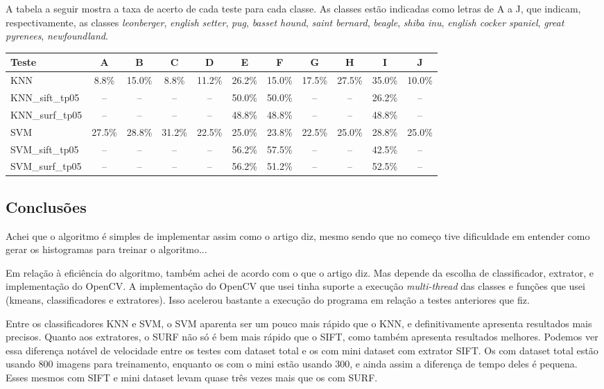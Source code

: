 \vspace{10pt}
A tabela a seguir mostra a taxa de acerto de cada teste para cada classe. As classes
estão indicadas como letras de A a J, que indicam, respectivamente, as classes 
\textit{leonberger}, \textit{english setter}, \textit{pug}, \textit{basset hound}, \textit{saint bernard},
\textit{beagle}, \textit{shiba inu}, \textit{english cocker spaniel}, \textit{great pyrenees}, \textit{newfoundland}.\\
\begin{tabular}{ | l | c | c | c | c | c | c | c | c | c | c | }
\hline
Teste       & A & B & C & D & E & F & G & H & I & J \\
\hline
KNN & 8.8\% & 15.0\% & 8.8\% & 11.2\% & 26.2\% & 15.0\% & 17.5\% & 27.5\% & 35.0\% & 10.0\% \\
\hline
KNN\_sift\_tp05 & -- & -- & -- & -- & 50.0\% & 50.0\% & -- & -- & 26.2\% & -- \\
\hline
KNN\_surf\_tp05 & -- & -- & -- & -- & 48.8\% & 48.8\% & -- & -- & 48.8\% & -- \\
\hline
SVM & 27.5\% & 28.8\% & 31.2\% & 22.5\% & 25.0\% & 23.8\% & 22.5\% & 25.0\% & 28.8\% & 25.0\% \\
\hline
SVM\_sift\_tp05 & -- & -- & -- & -- & 56.2\% & 57.5\% & -- & -- & 42.5\% & -- \\
\hline
SVM\_surf\_tp05 & -- & -- & -- & -- & 56.2\% & 51.2\% & -- & -- & 52.5\% & -- \\
\hline
\end{tabular}


\subsection{Conclusões}
Achei que o algoritmo é simples de implementar assim como o artigo diz, mesmo sendo que
no começo tive dificuldade em entender como gerar os histogramas para treinar o algoritmo...

Em relação à eficiência do algoritmo, também achei de acordo com o que o artigo diz. Mas depende
da escolha de classificador, extrator, e implementação do OpenCV. A implementação do OpenCV que
usei tinha suporte a execução \textit{multi-thread} das classes e funções que usei (kmeans, classificadores
e extratores). Isso acelerou bastante a execução do programa em relação a testes anteriores que fiz.

Entre os classificadores KNN e SVM, o SVM aparenta ser um pouco mais rápido que o KNN, e definitivamente
apresenta resultados mais precisos. Quanto aos extratores, o SURF não só é bem mais rápido que o SIFT,
como também apresenta resultados melhores. Podemos ver essa diferença notável de velocidade entre os testes
com dataset total e os com mini dataset com extrator SIFT. Os com dataset total estão usando 800 imagens 
para treinamento, enquanto os com o mini estão usando 300, e ainda assim a diferença de tempo deles é pequena.
Esses mesmos com SIFT e mini dataset levam quase três vezes mais que os com SURF.

